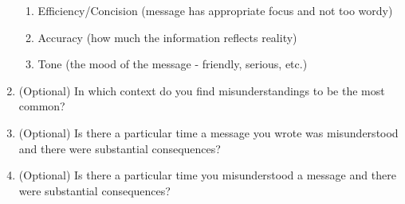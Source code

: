 \documentclass[acmsmall,screen,authorversion,nonacm]{acmart}
\begin{document}
\begin{enumerate}
\begin{enumerate}
            \item Efficiency/Concision (message has appropriate focus and not too wordy)
            \item Accuracy (how much the information reflects reality)
            \item Tone (the mood of the message - friendly, serious, etc.)
        \end{enumerate}
    \item (Optional) In which context do you find misunderstandings to be the most common? 
    \item (Optional) Is there a particular time a message you wrote was misunderstood and there were substantial consequences?
    \item (Optional) Is there a particular time you misunderstood a message and there were substantial consequences?
\end{enumerate}
\end{document}
